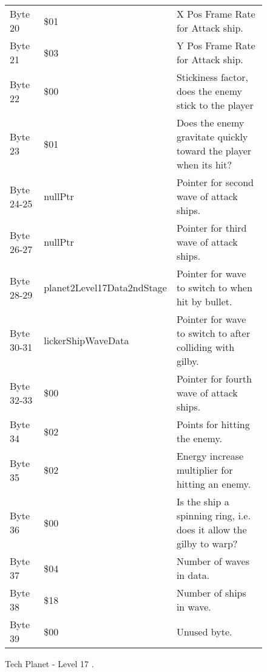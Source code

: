 \begin{figure}[H]
{\begin{adjustbox}{width=12cm}
\begin{tabular}{lll}
 Byte 20    & \$01                        & X Pos Frame Rate for Attack ship.                                   \\
 Byte 21    & \$03                        & Y Pos Frame Rate for Attack ship.                                   \\
 Byte 22    & \$00                        & Stickiness factor, does the enemy stick to the player               \\
 Byte 23    & \$01                        & Does the enemy gravitate quickly toward the player when its hit?    \\
 Byte 24-25 & nullPtr                    & Pointer for second wave of attack ships.                            \\
 Byte 26-27 & nullPtr                    & Pointer for third wave of attack ships.                             \\
 Byte 28-29 & planet2Level17Data2ndStage & Pointer for wave to switch to when hit by bullet.                   \\
 Byte 30-31 & lickerShipWaveData         & Pointer for  wave to switch to after colliding with gilby.          \\
 Byte 32-33 & \$00                        & Pointer for fourth wave of attack ships.                            \\
 Byte 34    & \$02                        & Points for hitting the enemy.                                       \\
 Byte 35    & \$02                        & Energy increase multiplier for hitting an enemy.                    \\
 Byte 36    & \$00                        & Is the ship a spinning ring, i.e. does it allow the gilby to warp?  \\
 Byte 37    & \$04                        & Number of waves in data.                                            \\
 Byte 38    & \$18                        & Number of ships in wave.                                            \\
 Byte 39    & \$00                        & Unused byte.                                                        \\
\bottomrule
\end{tabular}

  \end{adjustbox}

  }\caption*{Tech Planet - Level 17
.}
\end{figure}

